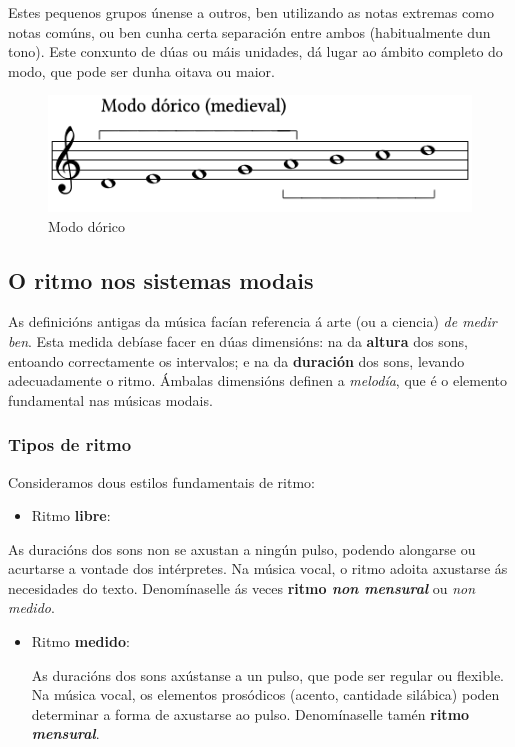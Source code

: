 \documentclass[a4paper, twoside]{templates/ociamthesis}
\providecommand{\tightlist}{%
  \setlength{\itemsep}{0pt}\setlength{\parskip}{0pt}}
\begin{document}
Estes pequenos grupos únense a outros, ben utilizando as notas extremas como notas comúns, ou ben cunha certa separación entre ambos (habitualmente dun tono). Este conxunto de dúas ou máis unidades, dá lugar ao ámbito completo do modo, que pode ser dunha oitava ou maior.

\begin{figure}
\centering
\includegraphics{figures/ud-03/escalas-2.png}
\caption{Modo dórico}
\end{figure}

\hypertarget{o-ritmo-nos-sistemas-modais}{%
\subsection{O ritmo nos sistemas modais}\label{o-ritmo-nos-sistemas-modais}}

As definicións antigas da música facían referencia á arte (ou a ciencia) \emph{de medir ben}. Esta medida debíase facer en dúas dimensións: na da \textbf{altura} dos sons, entoando correctamente os intervalos; e na da \textbf{duración} dos sons, levando adecuadamente o ritmo. Ámbalas dimensións definen a \emph{melodía}, que é o elemento fundamental nas músicas modais.

\hypertarget{tipos-de-ritmo}{%
\subsubsection{Tipos de ritmo}\label{tipos-de-ritmo}}

Consideramos dous estilos fundamentais de ritmo:

\begin{itemize}
\tightlist
\item
  Ritmo \textbf{libre}:
\end{itemize}

As duracións dos sons non se axustan a ningún pulso, podendo alongarse ou acurtarse a vontade dos intérpretes. Na música vocal, o ritmo adoita axustarse ás necesidades do texto. Denomínaselle ás veces \textbf{ritmo \emph{non mensural}} ou \emph{non medido}.

\begin{itemize}
\item
  Ritmo \textbf{medido}:

  As duracións dos sons axústanse a un pulso, que pode ser regular ou flexible. Na música vocal, os elementos prosódicos (acento, cantidade silábica) poden determinar a forma de axustarse ao pulso. Denomínaselle tamén \textbf{ritmo \emph{mensural}}.
\end{itemize}
\end{document}
